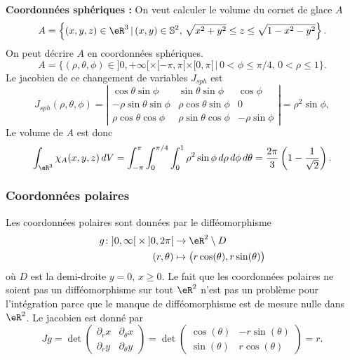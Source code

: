 \begin{example}
\textbf{Coordonnées sphériques : }On veut calculer le volume du cornet de glace  $A$
\[
A=\left\{(x,y,z)\in\eR^3\, \vert \, (x,y)\in \mathbb{S}^2, \,\sqrt{x^2+y^2}\leq z\leq \sqrt{1-x^2-y^2} \right\}.
\]
On peut décrire $A$ en coordonnées sphériques.
\[
A=\{(\rho,\theta,\phi) \in ]0, +\infty[\times [-\pi,\pi[\times [0,\pi[\,\vert\, 0<\phi\leq\pi/4, \, 0<\rho\leq 1 \}.
\]
Le jacobien de ce changement de variables  $J_{sph}$ est
\begin{equation}
 J_{sph}(\rho, \theta, \phi)= \left\vert\begin{array}{ccc}
\cos \theta \sin\phi & \sin \theta\sin\phi & \cos\phi\\
-\rho\sin \theta\sin\phi  & \rho\cos \theta\sin\phi & 0 \\
\rho\cos\theta\cos\phi&\rho\sin\theta\cos\phi& -\rho\sin\phi
\end{array}\right\vert= \rho^2\sin\phi,
\end{equation}
Le volume de $A$ est donc
\[
\int_{\eR^3}\chi_{A}(x,y,z)\, dV=\int_{-\pi}^{\pi}\int_0^{\pi/4}\int_{0}^{1}\rho^2\sin\phi \,d\rho\,d\phi\,d\theta=\frac{2\pi}{3}\left(1-\frac{1}{\sqrt{2}}\right).
\]
\end{example}

					\subsubsection{Coordonnées polaires}

Les coordonnées polaires sont données par le difféomorphisme
\begin{equation}
	\begin{aligned}
		g\colon \mathopen]0,\infty\mathclose[\times\mathopen]0,2\pi\mathclose[ &\to\eR^2\setminus D\\
		(r,\theta)&\mapsto \big( r\cos(\theta),r\sin(\theta) \big)
	\end{aligned}
\end{equation}
où $D$ est la demi-droite $y=0$, $x\geq 0$. Le fait que les coordonnées polaires ne soient pas un difféomorphisme sur tout $\eR^2$ n'est pas un problème pour l'intégration parce que le manque de difféomorphisme est de mesure nulle dans $\eR^2$. Le jacobien est donné par
\begin{equation}
	Jg=\det\begin{pmatrix}
	\partial_rx	&	\partial_{\theta}x	\\
	\partial_ry	&	\partial_{\theta}y
\end{pmatrix}=\det\begin{pmatrix}
	\cos(\theta)	&	-r\sin(\theta)	\\
	\sin(\theta)	&	r\cos(\theta)
\end{pmatrix}=r.
\end{equation}

